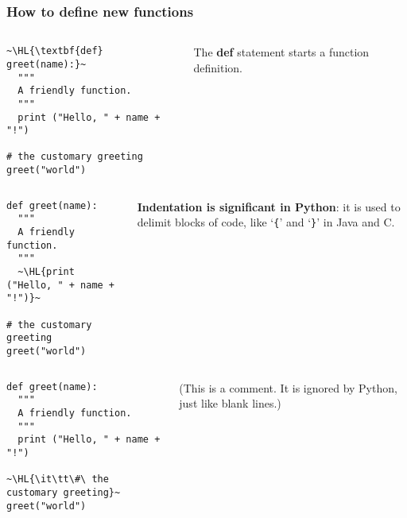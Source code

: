 \documentclass[english,serif,mathserif,xcolor=pdftex,dvipsnames,table]{beamer}
\begin{document}
\begin{frame}[fragile]
  \frametitle{How to define new functions}
  \begin{columns}[t]
    \begin{column}{0.5\textwidth}
\begin{lstlisting}
~\HL{\textbf{def} greet(name):}~
  """
  A friendly function.
  """
  print ("Hello, " + name + "!")

# the customary greeting
greet("world")
\end{lstlisting}
    \end{column}
    \begin{column}{0.5\textwidth}
      \raggedleft
      The \textbf{def} statement starts a function definition.
    \end{column}
  \end{columns}
\end{frame}

\begin{frame}[fragile]
  \begin{columns}[t]
    \begin{column}{0.5\textwidth}
\begin{lstlisting}
def greet(name):
  """
  A friendly function.
  """
  ~\HL{print ("Hello, " + name + "!")}~

# the customary greeting
greet("world")
\end{lstlisting}
    \end{column}
    \begin{column}{0.5\textwidth}
      \raggedleft
      \textbf{Indentation is significant in Python}: it is used to delimit
      blocks of code, like `\texttt{\{}' and `\texttt{\}}' in Java and C.
    \end{column}
  \end{columns}
\end{frame}

\begin{frame}[fragile]
  \begin{columns}[t]
    \begin{column}{0.5\textwidth}
\begin{lstlisting}
def greet(name):
  """
  A friendly function.
  """
  print ("Hello, " + name + "!")

~\HL{\it\tt\#\ the customary greeting}~
greet("world")
\end{lstlisting}
    \end{column}
    \begin{column}{0.5\textwidth}
      \raggedleft
      (This is a comment. It is ignored by Python, just like blank lines.)
    \end{column}
  \end{columns}
\end{frame}
\end{document}
